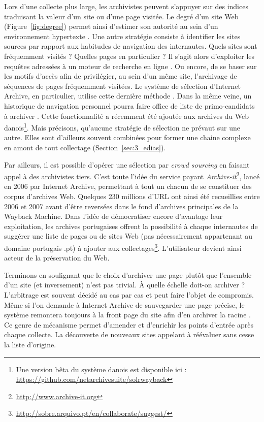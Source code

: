 \documentclass[symmetric,justified,marginals=raggedouter]{tufte-book}
\begin{document}
Lors d'une collecte plus large, les archivistes peuvent s'appuyer sur des indices traduisant la valeur d'un site ou d'une page visitée. Le degré d'un site Web (Figure~\ref{fig:degree}) permet ainsi d'estimer son autorité au sein d'un environnement hypertexte \citep{abiteboul_first_2002}. Une autre stratégie consiste à identifier les sites sources par rapport aux habitudes de navigation des internautes. Quels sites sont fréquemment visités ? Quelles pages en particulier ? Il s'agit alors d'exploiter les requêtes adressées à un moteur de recherche en ligne \citep{pandey_user-centric_2005}. Ou encore, de se baser sur les motifs d'accès \citep{alnoamany_access_2013} afin de privilégier, au sein d'un même site, l'archivage de séquences de pages fréquemment visitées. Le système de sélection d'Internet Archive, en particulier, utilise cette dernière méthode \citep{kimpton_year-by-year:_2006}. Dans la même veine, un historique de navigation personnel pourra faire office de liste de primo-candidats à archiver \citep{dumais_stuff_2016}. Cette fonctionnalité a récemment été ajoutée aux archives du Web danois\footnote{\RaggedOuter Une version bêta du système danois est disponible ici : \url{https://github.com/netarchivesuite/solrwayback}}. Mais précisons, qu'aucune stratégie de sélection ne prévaut sur une autre. Elles sont d'ailleurs souvent combinées pour former une chaine complexe en amont de tout collectage (Section~\ref{sec:3_edias}). 

Par ailleurs, il est possible d'opérer une sélection par \textit{crowd sourcing} en faisant appel à des archivistes tiers. C'est toute l'idée du service payant \textit{Archive-it}\footnote{\RaggedOuter \url{http://www.archive-it.org}}, lancé en 2006 par Internet Archive, permettant à tout un chacun de se constituer des corpus d'archives Web. Quelques 230 millions d'URL ont ainsi été recueillies entre 2006 et 2007 avant d'être reversées dans le fond d'archives principales de la Wayback Machine. Dans l'idée de démocratiser encore d'avantage leur exploitation, les archives portugaises offrent la possibilité à chaque internautes de suggérer une liste de pages ou de sites Web (pas nécessairement appartenant au domaine portugais .pt) à ajouter aux  collectages\footnote{\RaggedOuter \url{http://sobre.arquivo.pt/en/collaborate/suggest/}}. L'utilisateur devient ainsi acteur de la préservation du Web.

Terminons en soulignant que le choix d'archiver une page plutôt que l'ensemble d'un site (et inversement) n'est pas trivial. À quelle échelle doit-on archiver ? L'arbitrage est souvent décidé au cas par cas et peut faire l'objet de compromis. Même si l'on demande à Internet Archive de sauvegarder une page précise, le système remontera toujours à la front page du site afin d'en archiver la racine  \citep{kimpton_year-by-year:_2006}. Ce genre de mécanisme permet d'amender et d'enrichir les points d'entrée après chaque collecte. La découverte de nouveaux sites appelant à réévaluer sans cesse la liste d'origine.    
\end{document}
